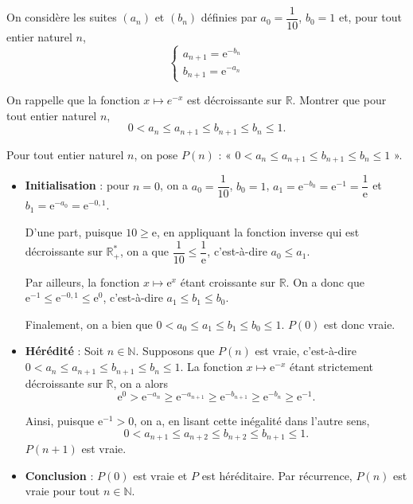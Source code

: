 \documentclass[11pt,fleqn]{book} %
\begin{document}
\begin{exercise}[subtitle={(Centres étrangers 2022)}]
On considère les suites \((a_n)\) et \((b_n)\) définies par \(a_0= \dfrac{1}{10}\), \(b_0=1\) et, pour tout entier naturel \(n\), \[\left\{\begin{array}{l}a_{n+1}=\mathrm{e}^{-b_n}\\b_{n+1}=\mathrm{e}^{-a_n}\end{array}\right.\]

On rappelle que la fonction \(x\mapsto e^{-x}\) est décroissante sur \(\mathbb{R}\). Montrer que pour tout entier naturel \(n\), 
\[ 0 < a_n \leqslant a_{n+1} \leqslant b_{n+1} \leqslant b_n \leqslant 1 .\]\end{exercise}

\begin{solution}Pour tout entier naturel \(n\), on pose \(P(n)\) : « \(0 < a_n \leqslant a_{n+1} \leqslant b_{n+1} \leqslant b_n \leqslant 1\) ».

\begin{itemize} \item \textbf{Initialisation} : pour \(n=0\), on a \(a_0=\dfrac{1}{10}\), \(b_0=1\), \(a_1 =\mathrm{e}^{-b_0}=\mathrm{e}^{-1}=\dfrac{1}{\mathrm{e}}\) et \(b_1=\mathrm{e}^{-a_0}=\mathrm{e}^{-0,1}\).

D'une part, puisque \( 10 \geqslant \mathrm{e}\), en appliquant la fonction inverse qui est décroissante sur \(\mathbb{R}^*_+\), on a que \(\dfrac{1}{10} \leqslant \dfrac{1}{\mathrm{e}}\), c'est-à-dire \(a_0 \leqslant a_1\). 

Par ailleurs, la fonction \(x \mapsto \mathrm{e}^{x}\) étant croissante sur \(\mathbb{R}\). On a donc que \(\mathrm{e}^{-1} \leqslant \mathrm{e}^{-0,1} \leqslant \mathrm{e}^0\), c'est-à-dire \(a_1 \leqslant b_1 \leqslant b_0\). 

Finalement, on a bien que \( 0< a_0 \leqslant a_1 \leqslant b_1 \leqslant b_0 \leqslant 1\). \(P(0)\) est donc vraie.

\item \textbf{Hérédité} : Soit \(n\in\mathbb{N}\). Supposons que \(P(n)\) est vraie, c'est-à-dire \(0 < a_n \leqslant a_{n+1} \leqslant b_{n+1} \leqslant b_n \leqslant 1\). La fonction \( x \mapsto \mathrm{e}^{-x}\) étant strictement décroissante sur \(\mathbb{R}\), on a alors 
\[\mathrm{e}^0 > \mathrm{e}^{-a_n} \geqslant \mathrm{e}^{-a_{n+1}} \geqslant \mathrm{e}^{-b_{n+1}} \geqslant \mathrm{e}^{-b_n} \geqslant \mathrm{e}^{-1}.\]

Ainsi, puisque \(\mathrm{e}^{-1} > 0\), on a, en lisant cette inégalité dans l'autre sens,
\[0 < a_{n+1} \leqslant a_{n+2} \leqslant b_{n+2} \leqslant b_{n+1} \leqslant 1.\]
\(P(n+1)\) est vraie.
\item \textbf{Conclusion} : \(P(0)\) est vraie et \(P\) est héréditaire. Par récurrence, \(P(n)\) est vraie pour tout \(n\in\mathbb{N}\).
\end{itemize}\end{solution}
\end{document}
